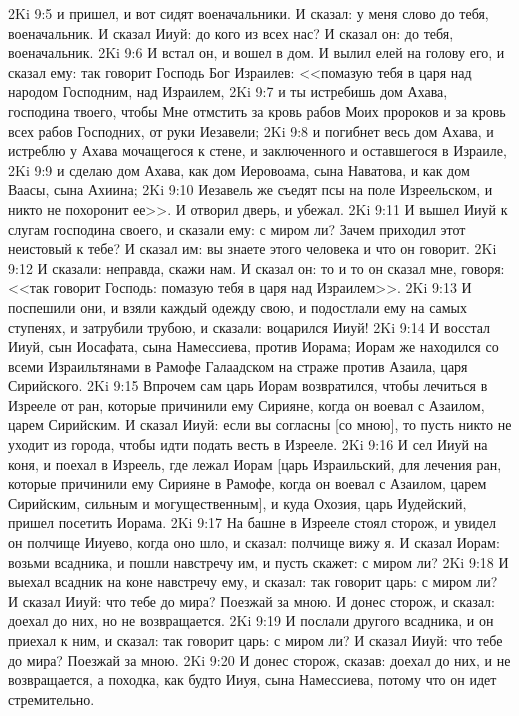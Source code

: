 \vs 2Ki 9:5 и пришел, и вот сидят военачальники. И сказал: у меня слово до тебя, военачальник. И сказал Ииуй: до кого из всех нас? И сказал он: до тебя, военачальник.
\vs 2Ki 9:6 И встал он, и вошел в дом. И  вылил елей на голову его, и сказал ему: так говорит Господь Бог Израилев: <<помазую тебя в царя над народом Господним, над Израилем,
\vs 2Ki 9:7 и ты истребишь дом Ахава, господина твоего, чтобы Мне отмстить за кровь рабов Моих пророков и за кровь всех рабов Господних,  от руки Иезавели;
\vs 2Ki 9:8 и погибнет весь дом Ахава, и истреблю у Ахава мочащегося к стене, и заключенного и оставшегося в Израиле,
\vs 2Ki 9:9 и сделаю дом Ахава, как дом Иеровоама, сына Наватова, и как дом Ваасы, сына Ахиина;
\vs 2Ki 9:10 Иезавель же съедят псы на поле Изреельском, и никто не похоронит ее>>. И отворил дверь, и убежал.
\vs 2Ki 9:11 И вышел Ииуй к слугам господина своего, и сказали ему: с миром ли? Зачем приходил этот неистовый к тебе? И сказал им: вы знаете этого человека и что он говорит.
\vs 2Ki 9:12 И сказали: неправда, скажи нам. И сказал он: то и то он сказал мне, говоря: <<так говорит Господь: помазую тебя в царя над Израилем>>.
\vs 2Ki 9:13 И поспешили они, и взяли каждый одежду свою, и подостлали ему на самых ступенях, и затрубили трубою, и сказали: воцарился Ииуй!
\vs 2Ki 9:14 И восстал Ииуй, сын Иосафата, сына Намессиева, против Иорама; Иорам же находился со всеми Израильтянами в Рамофе Галаадском на страже против Азаила, царя Сирийского.
\vs 2Ki 9:15 Впрочем сам царь Иорам возвратился, чтобы лечиться в Изрееле от ран, которые причинили ему Сирияне, когда он воевал с Азаилом, царем Сирийским. И сказал Ииуй: если вы согласны [со мною], то пусть никто не уходит из города, чтобы идти подать весть в Изрееле.
\vs 2Ki 9:16 И сел Ииуй на коня, и поехал в Изреель, где лежал Иорам [царь Израильский, для лечения ран, которые причинили ему Сирияне в Рамофе, когда он воевал с Азаилом, царем Сирийским, сильным и могущественным], и куда Охозия, царь Иудейский, пришел посетить Иорама.
\vs 2Ki 9:17 На башне в Изрееле стоял сторож, и увидел он полчище Ииуево, когда оно шло, и сказал: полчище вижу я. И сказал Иорам: возьми всадника, и пошли навстречу им, и пусть скажет: с миром ли?
\vs 2Ki 9:18 И выехал всадник на коне навстречу ему, и сказал: так говорит царь: с миром ли? И сказал Ииуй: что тебе до мира? Поезжай за мною. И донес сторож, и сказал: доехал до них, но не возвращается.
\vs 2Ki 9:19 И послали другого всадника, и он приехал к ним, и сказал: так говорит царь: с миром ли? И сказал Ииуй: что тебе до мира? Поезжай за мною.
\vs 2Ki 9:20 И донес сторож, сказав: доехал до них, и не возвращается, а походка, как будто Ииуя, сына Намессиева, потому что он идет стремительно.
